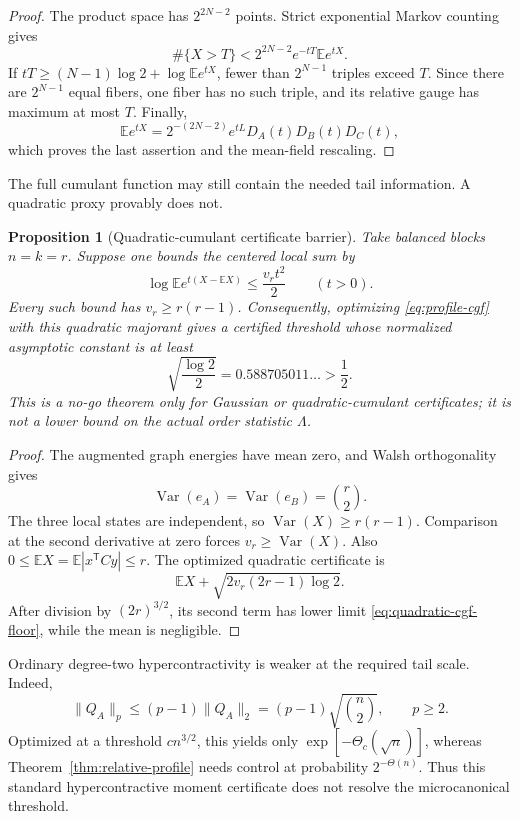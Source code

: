 \documentclass[11pt]{article}
\newtheorem{proposition}[theorem]{Proposition}
\newcommand{\E}{\mathbb E}
\begin{document}
\begin{proof}
The product space has $2^{2N-2}$ points.  Strict exponential Markov counting
gives
\[
 \#\{X>T\}<2^{2N-2}e^{-tT}\E e^{tX}.
\]
If $tT\ge(N-1)\log2+\log\E e^{tX}$, fewer than $2^{N-1}$ triples exceed
$T$.  Since there are $2^{N-1}$ equal fibers, one fiber has no such triple,
and its relative gauge has maximum at most $T$.  Finally,
\[
 \E e^{tX}
 =2^{-(2N-2)}e^{tL}D_A(t)D_B(t)D_C(t),
\]
which proves the last assertion and the mean-field rescaling.
\end{proof}

The full cumulant function may still contain the needed tail information.
A quadratic proxy provably does not.

\begin{proposition}[Quadratic-cumulant certificate barrier]
\label{prop:quadratic-cgf-floor}
Take balanced blocks $n=k=r$.  Suppose one bounds the centered local sum by
\[
 \log\E e^{t(X-\E X)}\le\frac{v_rt^2}{2}\qquad(t>0).
\]
Every such bound has $v_r\ge r(r-1)$.  Consequently, optimizing
\eqref{eq:profile-cgf} with this quadratic majorant gives a certified
threshold whose normalized asymptotic constant is at least
\begin{equation}
 \sqrt{\frac{\log2}{2}}=0.588705011\ldots>\frac12.
 \label{eq:quadratic-cgf-floor}
\end{equation}
This is a no-go theorem only for Gaussian or quadratic-cumulant
certificates; it is not a lower bound on the actual order statistic
$\Lambda$.
\end{proposition}

\begin{proof}
The augmented graph energies have mean zero, and Walsh orthogonality gives
\[
 \operatorname{Var}(e_A)=\operatorname{Var}(e_B)=\binom r2.
\]
The three local states are independent, so
$\operatorname{Var}(X)\ge r(r-1)$.  Comparison at the second derivative at
zero forces $v_r\ge\operatorname{Var}(X)$.  Also
$0\le\E X=\E|x^{\mathsf T}Cy|\le r$.  The optimized quadratic certificate is
\[
 \E X+\sqrt{2v_r(2r-1)\log2}.
\]
After division by $(2r)^{3/2}$, its second term has lower limit
\eqref{eq:quadratic-cgf-floor}, while the mean is negligible.
\end{proof}

Ordinary degree-two hypercontractivity is weaker at the required tail scale.
Indeed,
\[
 \|Q_A\|_p\le(p-1)\|Q_A\|_2
 =(p-1)\sqrt{\binom n2},\qquad p\ge2.
\]
Optimized at a threshold $cn^{3/2}$, this yields only
$\exp[-\Theta_c(\sqrt n)]$, whereas
Theorem~\ref{thm:relative-profile} needs control at probability
$2^{-\Theta(n)}$.  Thus this standard hypercontractive moment certificate
does not resolve the microcanonical threshold.
\end{document}
